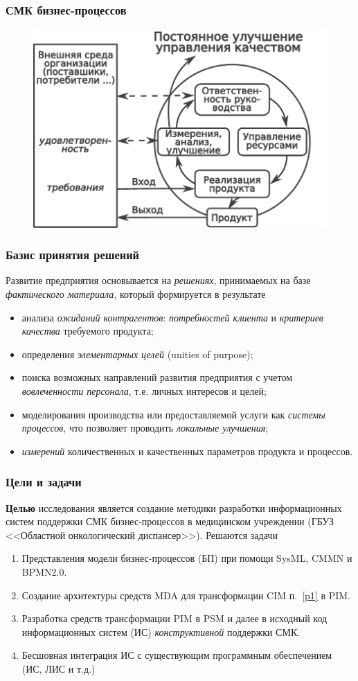 \documentclass[10pt]{beamer}
\begin{document}
\begin{frame}
  \frametitle{СМК бизнес-процессов}
  \begin{figure}[htb]
    \centering
    \includegraphics[width=0.9\linewidth]{qms-pics/iso9001-ru.pdf}
    \label{fig:iso9001}
  \end{figure}
\end{frame}
\begin{frame}
  \frametitle{Базис принятия решений}
  Развитие предприятия основывается на \emph{решениях}, принимаемых на базе \emph{фактического материала}, который формируется в результате
  \begin{itemize}
  \item анализа \emph{ожиданий контрагентов}: \emph{потребностей клиента} и \emph{критериев качества} требуемого продукта;
  \item определения \emph{элементарных целей} (unities of purpose);
  \item поиска возможных направлений развития предприятия с учетом \emph{вовлеченности персонала}, т.е. личных интересов и целей;
  \item моделирования производства или предоставляемой услуги как \emph{системы процессов}, что позволяет проводить \emph{локальные улучшения};
  \item \emph{измерений} количественных и качественных параметров продукта и процессов.
  \end{itemize}
\end{frame}
\begin{frame}
  \frametitle{Цели и задачи}
  \textbf{Целью} исследования является создание методики разработки информационных систем поддержки СМК бизнес-процессов в медицинском учреждении (ГБУЗ <<Областной онкологический диспансер>>). Решаются задачи
  \begin{enumerate}
  \item Представления модели бизнес-процессов (БП) при помощи SysML, CMMN и BPMN2.0. \label{p1}
  \item Создание архитектуры средств MDA для трансформации CIM п.~\ref{p1} в PIM.
  \item Разработка средств трансформации PIM в PSM и далее в исходный код информационных систем (ИС) \emph{конструктивной} поддержки СМК.
  \item Бесшовная интеграция ИС с существующим программным обеспечением (ИС, ЛИС и т.д.)
  \end{enumerate}
\end{frame}
\end{document}
